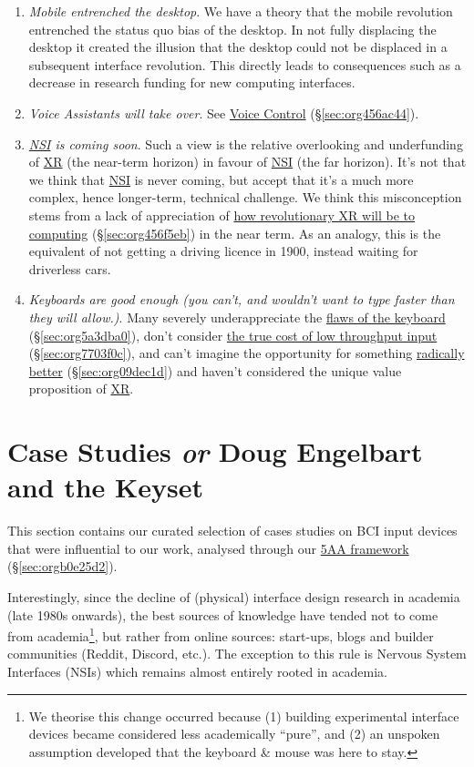 \documentclass[logo,bsc,singlespacing,parskip]{infthesis}
\begin{document}
\begin{enumerate}
\item \emph{Mobile entrenched the desktop}.
We have a theory that the mobile revolution entrenched the status quo bias of the desktop.
In not fully displacing the desktop it created the illusion that the desktop could not be displaced in a subsequent interface revolution.
This directly leads to consequences such as a decrease in research funding for new computing interfaces.

\item \emph{Voice Assistants will take over}.
See \hyperref[sec:org456ac44]{Voice Control} (\S \ref{sec:org456ac44}).

\item \emph{\hyperref[org5662848]{NSI} is coming soon}.
Such a view is the relative overlooking and underfunding of \hyperref[orgf7f8e78]{XR} (the near-term horizon) in favour of \hyperref[org5662848]{NSI} (the far horizon).
It's not that we think that \hyperref[org5662848]{NSI} is never coming, but accept that it's a much more complex, hence longer-term, technical challenge.
We think this misconception stems from a lack of appreciation of \hyperref[sec:org456f5eb]{how revolutionary XR will be to computing} (\S \ref{sec:org456f5eb}) in the near term.
As an analogy, this is the equivalent of not getting a driving licence in 1900, instead waiting for driverless cars.

\item \emph{Keyboards are good enough (you can't, and wouldn't want to type faster than they will allow.)}.
Many severely underappreciate the \hyperref[sec:org5a3dba0]{flaws of the keyboard} (\S \ref{sec:org5a3dba0}), don't consider \hyperref[sec:org7703f0c]{the true cost of low throughput input} (\S \ref{sec:org7703f0c}), and can't imagine the opportunity for something \hyperref[sec:org09dec1d]{radically better} (\S \ref{sec:org09dec1d}) and haven't considered the unique value proposition of \hyperref[orgf7f8e78]{XR}.
\end{enumerate}

\part{Case Studies \emph{or} Doug Engelbart and the Keyset}
\label{sec:org996b0f9}
This section contains our curated selection of cases studies on BCI input devices that were influential to our work, analysed through our \hyperref[sec:orgb0e25d2]{5AA framework} (\S \ref{sec:orgb0e25d2}).

Interestingly, since the decline of (physical) interface design research in academia (late 1980s onwards), the best sources of knowledge have tended not to come from academia\footnote{We theorise this change occurred because (1) building experimental interface devices became considered less academically ``pure'', and (2) an unspoken assumption developed that the keyboard \& mouse was here to stay.}, but rather from online sources: start-ups, blogs and builder communities (Reddit, Discord, etc.).
The exception to this rule is Nervous System Interfaces (NSIs) which remains almost entirely rooted in academia.
\end{document}

